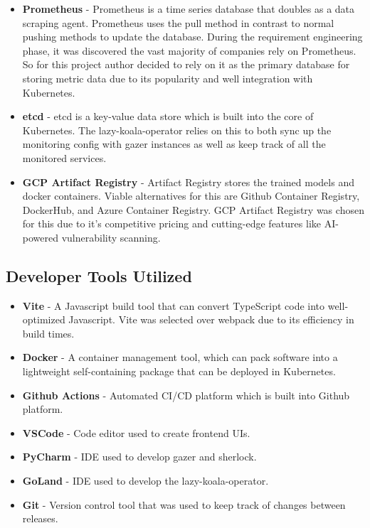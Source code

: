 \begin{itemize}
    \item \textbf{Prometheus} - Prometheus is a time series database that doubles as a data scraping agent. Prometheus uses the pull method in contrast to normal pushing methods to update the database. During the requirement engineering phase, it was discovered the vast majority of companies rely on Prometheus. So for this project author decided to rely on it as the primary database for storing metric data due to its popularity and well integration with Kubernetes.
    \item \textbf{etcd} - etcd is a key-value data store which is built into the core of Kubernetes. The \ac{lazy-koala-operator} relies on this to both sync up the monitoring config with \ac{gazer} instances as well as keep track of all the monitored services.
    \item \textbf{GCP Artifact Registry} - Artifact Registry stores the trained models and docker containers. Viable alternatives for this are Github Container Registry, DockerHub, and Azure Container Registry. GCP Artifact Registry was chosen for this due to it's competitive pricing and cutting-edge features like AI-powered vulnerability scanning. 
\end{itemize}

\subsection{Developer Tools Utilized}
\begin{itemize}
    \item \textbf{Vite} - A Javascript build tool that can convert TypeScript code into well-optimized Javascript. Vite was selected over webpack due to its efficiency in build times.
    \item \textbf{Docker} - A container management tool, which can pack software into a lightweight self-containing package that can be deployed in Kubernetes.
    \item \textbf{Github Actions} - Automated CI/CD platform which is built into Github platform.
    \item \textbf{VSCode} - Code editor used to create frontend UIs.
    \item \textbf{PyCharm} - IDE used to develop \ac{gazer} and \ac{sherlock}.
    \item \textbf{GoLand} - IDE used to develop the \ac{lazy-koala-operator}.
    \item \textbf{Git} - Version control tool that was used to keep track of changes between releases.
\end{itemize}

